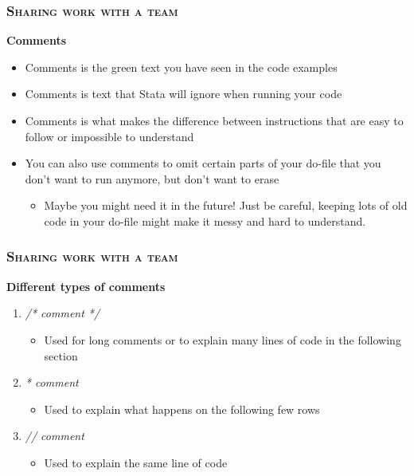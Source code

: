 \documentclass[10pt]{beamer}
\begin{document}
	\begin{frame}
		\frametitle{\textsc{Sharing work with a team}}
		\begin{center}	
			\Large\textbf{Comments}
		\end{center}	
		\begin{itemize}	
			\item Comments is the green text you have seen in the code examples
			\item Comments is text that Stata will ignore when running your code
			\item Comments is what makes the difference between instructions that are easy to follow or impossible to understand
			\item You can also use comments to omit certain parts of your do-file that you don’t want to run anymore, but don’t want to erase
			\begin{itemize}
				\item Maybe you might need it in the future! Just be careful, keeping lots of old code in your do-file might make it messy and hard to understand.
			\end{itemize}
		\end{itemize}
	\end{frame}
	
	\begin{frame}
		\frametitle{\textsc{Sharing work with a team}}
		\begin{center}	
			\Large\textbf{Different types of comments}
		\end{center}	
		\begin{enumerate}	
			\item \textit{/* comment */} 
			\begin{itemize}
				\item Used for long comments or to explain many lines of code in the following section
			\end{itemize}
			\item \textit{* comment} 
			\begin{itemize}
				\item Used to explain what happens on the following few rows
			\end{itemize}
			\item \textit{ // comment} 
			\begin{itemize}
				\item Used to explain the same line of code
			\end{itemize}
		\end{enumerate}
	\end{frame}
	
\end{document}
